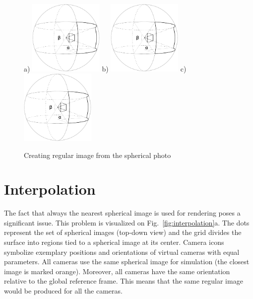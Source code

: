\documentclass{svproc}
\begin{document}
\begin{figure}[ht!]
    \centering
    a) \hspace{-3mm}\includegraphics[width=0.32\textwidth]{img/sphere}
    b) \hspace{-3mm}\includegraphics[width=0.32\textwidth]{img/sphere}
    c) \hspace{-3mm}\includegraphics[width=0.32\textwidth]{img/sphere}
    \caption{Creating regular image from the spherical photo}
    \label{fig:spheres}
\end{figure}

\section{Interpolation}
\label{sec:iterpolate}


The fact that always the nearest spherical image is used for rendering poses a significant issue.
This problem is visualized on Fig.~\ref{fig:interpolation}a.
The dots represent the set of spherical images (top-down view) and the grid divides the surface into regions tied to a spherical image at its center.
Camera icons symbolize exemplary positions and orientations of virtual cameras with equal parameters.
All cameras use the same spherical image for simulation (the closest image is marked orange).
Moreover, all cameras have the same orientation relative to the global reference frame.
This means that the same regular image would be produced for all the cameras.
\end{document}
